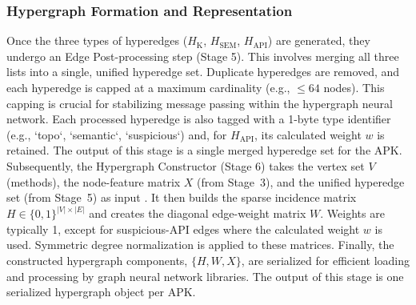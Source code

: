 \documentclass[runningheads]{llncs}
\begin{document}
\subsubsection{Hypergraph Formation and Representation}
Once the three types of hyperedges ($H_{\mathrm{K}}$, $H_{\mathrm{SEM}}$, $H_{\mathrm{API}}$) are generated, they undergo an Edge Post-processing step (Stage 5). This involves merging all three lists into a single, unified hyperedge set. Duplicate hyperedges are removed, and each hyperedge is capped at a maximum cardinality (e.g., $\le 64$ nodes). This capping is crucial for stabilizing message passing within the hypergraph neural network. Each processed hyperedge is also tagged with a 1-byte type identifier (e.g., `topo`, `semantic`, `suspicious`) and, for $H_{\mathrm{API}}$, its calculated weight $w$ is retained. The output of this stage is a single merged hyperedge set for the APK.
Subsequently, the Hypergraph Constructor (Stage 6) takes the vertex set $V$ (methods), the node-feature matrix $X$ (from Stage~3), and the unified hyperedge set (from Stage~5) as input \cite{gao2023}. It then builds the sparse incidence matrix $H \in \{0,1\}^{|V| \times |E|}$ and creates the diagonal edge-weight matrix $W$. Weights are typically 1, except for suspicious-API edges where the calculated weight $w$ is used. Symmetric degree normalization is applied to these matrices. Finally, the constructed hypergraph components, $\{H, W, X\}$, are serialized for efficient loading and processing by graph neural network libraries. The output of this stage is one serialized hypergraph object per APK.
\end{document}

